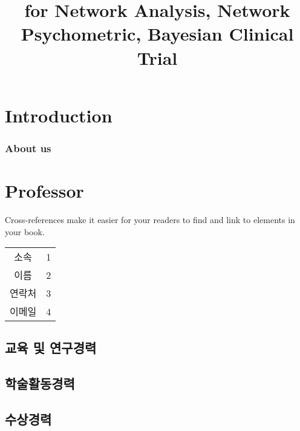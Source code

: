 \documentclass[
]{book}
\title{for Network Analysis, Network Psychometric, Bayesian Clinical Trial}
\author{}
\date{\vspace{-2.5em}}
\begin{document}
\maketitle

{
\setcounter{tocdepth}{1}
\tableofcontents
}
\hypertarget{introduction}{%
\chapter{Introduction}\label{introduction}}

\hypertarget{about-us}{%
\subsection{About us}\label{about-us}}

\hypertarget{professor}{%
\chapter{Professor}\label{professor}}

Cross-references make it easier for your readers to find and link to elements in your book.

\begin{longtable}[]{@{}cc@{}}
\toprule
& \\
\midrule
\endhead
소속 & 1 \\
이름 & 2 \\
연락처 & 3 \\
이메일 & 4 \\
\bottomrule
\end{longtable}

\hypertarget{uxad50uxc721-uxbc0f-uxc5f0uxad6cuxacbduxb825}{%
\section{교육 및 연구경력}\label{uxad50uxc721-uxbc0f-uxc5f0uxad6cuxacbduxb825}}

\hypertarget{uxd559uxc220uxd65cuxb3d9uxacbduxb825}{%
\section{학술활동경력}\label{uxd559uxc220uxd65cuxb3d9uxacbduxb825}}

\hypertarget{uxc218uxc0c1uxacbduxb825}{%
\section{수상경력}\label{uxc218uxc0c1uxacbduxb825}}
\end{document}

